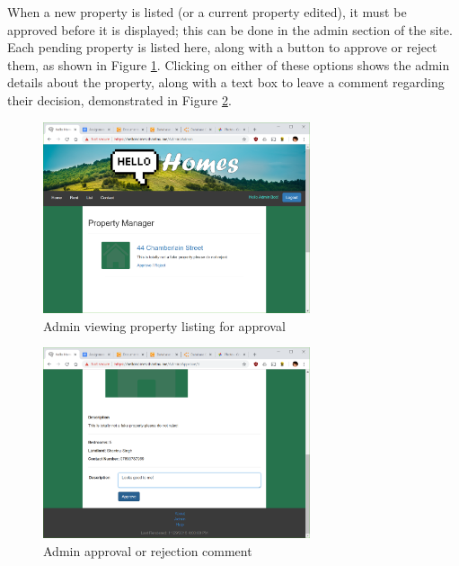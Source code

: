 \documentclass{article}
\begin{document}
        \par
            When a new property is listed (or a current property edited), it must be approved before it is displayed; this can be done in the admin section of the site.
            Each pending property is listed here, along with a button to approve or reject them, as shown in Figure \ref{fig:admin_page}.
            Clicking on either of these options shows the admin details about the property, along with a text box to leave a comment regarding their decision, demonstrated in Figure \ref{fig:admin_approval}.

            \begin{figure}[ht]
                \centering
                \includegraphics[width=0.7\textwidth]{figures/admin_page.png}
                \caption[Approve Property]{Admin viewing property listing for approval}
                \label{fig:admin_page}
            \end{figure}

            \begin{figure}[ht]
                \centering
                \includegraphics[width=0.7\textwidth]{figures/admin_approval.png}
                \caption[Comment on Property]{Admin approval or rejection comment}
                \label{fig:admin_approval}
            \end{figure}
\end{document}
